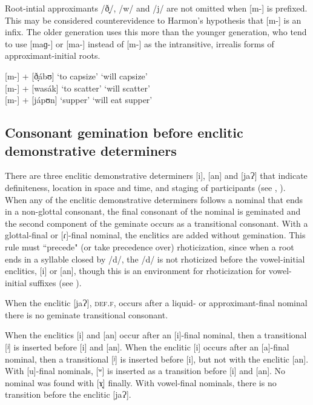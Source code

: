 Root-intial approximants /ð̞/, /w/ and /j/ are not omitted when [m-] is prefixed. This may be considered counterevidence to Harmon’s hypothesis that [m-] is an infix. The older generation uses this more than the younger generation, who tend to use [maɡ-] or [ma-] instead of [m-] as the intransitive, irrealis forms of approximant-initial roots.

\ea
{}[m-] + [ð̞ábʊ] ‘to capsize’  \rightarrow [mð̞ábʊ] ‘will capsize’ \\
{}[m-] + [wasák] ‘to scatter’ \rightarrow [mwasák] ‘will scatter’ \\
{}[m-] + [jápʊn] ‘supper’ \rightarrow [mjápʊn] ‘will eat supper’
\z

\subsection{Consonant gemination before enclitic demonstrative determiners}
\label{sec:gemination} 

There are three enclitic demonstrative determiners [i], [an] and [jaɁ] that indicate definiteness, location in space and time, and staging of participants (see , ). When any of the enclitic demonstrative determiners follows a nominal that ends in a non-glottal consonant, the final consonant of the nominal is geminated and the second component of the geminate occurs as a transitional consonant. With a glottal-final or [ɾ]-final nominal, the enclitics are added without gemination. This rule must ``precede" (or take precedence over) rhoticization, since when a root ends in a syllable closed by /d/, the /d/ is not rhoticized before the vowel-initial enclitics, [i] or [an], though this is an environment for rhoticization for vowel-initial suffixes (see ). 

\newpage
When the enclitic [jaɁ], \textsc{def.f}, occurs after a liquid- or approximant{}-final nominal there is no geminate transitional consonant.

When the enclitics [i] and [an] occur after an [i]-final nominal, then a transitional [ʲ] is inserted before [i] and [an]. When the enclitic [i] occurs after an [a]-final nominal, then a transitional [ʲ] is inserted before [i], but not with the enclitic [an]. With [u]{}-final nominals, [ʷ] is inserted as a transition before [i] and [an]. No nominal was found with [ɤ̞] finally. With vowel-final nominals, there is no transition before the enclitic [jaɁ].

